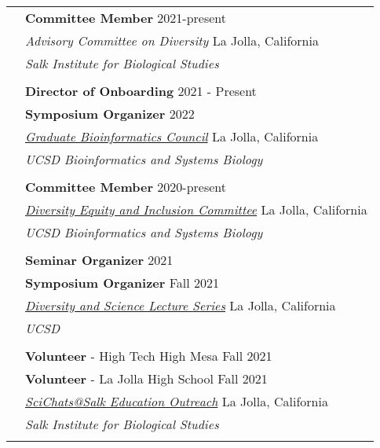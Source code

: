\documentclass[letterpaper, 11pt]{article}
\begin{document}
\begin{longtable}{p{1.6in}p{4.9in}}

{\color{OliveGreen}{Service / Outreach}}
& \textbf{Committee Member} \hfill 2021-present \\
& \textit{Advisory Committee on Diversity} \hfill La Jolla, California \\
& \textit{Salk Institute for Biological Studies} \\
& \\

& \textbf{Director of Onboarding} \hfill 2021 - Present \\
& \textbf{Symposium Organizer} \hfill 2022 \\
& \href{https://gbic.ucsd.edu/}{\textit{Graduate Bioinformatics Council}} \hfill La Jolla, California \\
& \textit{UCSD Bioinformatics and Systems Biology} \\
& \\

& \textbf{Committee Member} \hfill 2020-present \\
& \href{https://bioinformatics.ucsd.edu/node/19020}{\textit{Diversity Equity and Inclusion Committee}} \hfill La Jolla, California \\
& \textit{UCSD Bioinformatics and Systems Biology} \\
& \\

& \textbf{Seminar Organizer} \hfill 2021 \\
& \textbf{Symposium Organizer} \hfill Fall 2021 \\
& \href{https://www.ucsddasl.com/about}{\textit{Diversity and Science Lecture Series}} \hfill La Jolla, California \\
& \textit{UCSD} \\
& \\

& \textbf{Volunteer} - High Tech High Mesa \hfill Fall 2021 \\
& \textbf{Volunteer} - La Jolla High School \hfill Fall 2021 \\
& \href{https://www.salk.edu/about/education-outreach/volunteer-opportunities/scichatssalk/}{\textit{SciChats@Salk Education Outreach}} \hfill La Jolla, California \\
& \textit{Salk Institute for Biological Studies} \\
& \\


\end{longtable}
\end{document}
